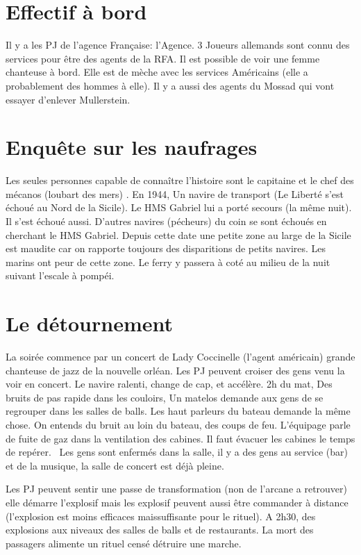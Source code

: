 \documentclass[oneside,12pt]{book}
\begin{document}
\begin{flushleft}
\section{Effectif à bord}
Il y a les PJ de l'agence Française: l'Agence.
3 Joueurs allemands sont connu des services pour être des agents de la RFA.
Il est possible de voir une femme chanteuse à bord. Elle est de mèche avec les services Américains (elle a probablement des hommes à elle). 
Il y a aussi des agents du Mossad qui vont essayer d'enlever Mullerstein.

\section{Enquête sur les naufrages}
Les seules personnes capable de connaître l'histoire sont le capitaine et le chef des mécanos (loubart des mers) . 
En 1944, Un navire de transport (Le Liberté s'est échoué au Nord de la Sicile). Le HMS Gabriel lui a porté secours (la même nuit). Il s'est échoué aussi.
D'autres navires (pécheurs) du coin se sont échoués en cherchant le HMS Gabriel. Depuis cette date une petite zone au large de la Sicile est maudite car on rapporte toujours des disparitions de petits navires.
Les marins ont peur de cette zone. Le ferry y passera à coté au milieu de la nuit suivant l'escale à pompéi.


\section{Le détournement}
La soirée commence par un concert de Lady Coccinelle (l'agent américain) grande chanteuse de jazz de la nouvelle orléan. Les PJ peuvent croiser des gens venu la voir en concert. 
Le navire ralenti, change de cap, et accélère. 
2h du mat, Des bruits de pas rapide dans les couloirs, Un matelos demande aux gens de se regrouper dans les salles de balls. Les haut parleurs du bateau demande la même chose.
On entends du bruit au loin du bateau, des coups de feu.
L'équipage parle de fuite de gaz dans la ventilation des cabines. Il faut évacuer les cabines le temps de repérer. 
Les gens sont enfermés dans la salle, il y a des gens au service (bar) et de la musique, la salle de concert est déjà pleine.  

Les PJ peuvent sentir une passe de transformation (non de l'arcane a retrouver) elle démarre l'explosif mais les explosif peuvent aussi être commander à distance (l'explosion est moins efficaces maissuffisante pour le rituel).
A 2h30, des explosions aux niveaux des salles de balls et de restaurants. 
La mort des passagers alimente un rituel censé détruire une marche.


\end{flushleft}
\end{document}
